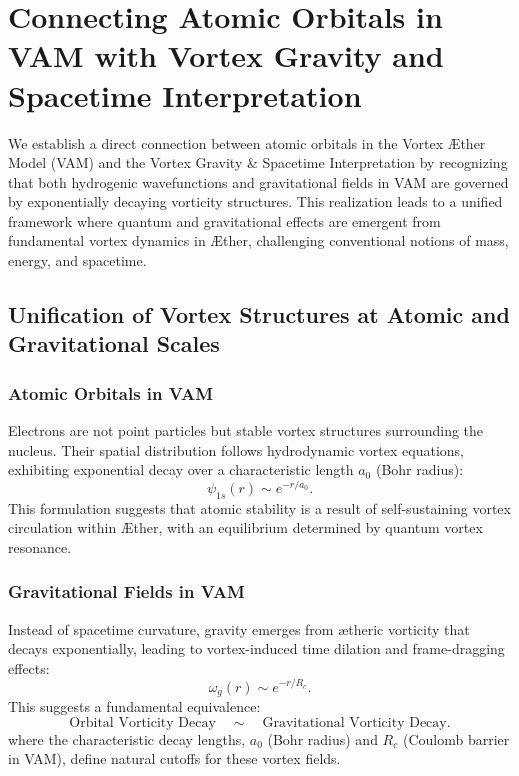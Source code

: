 
\section{Connecting Atomic Orbitals in VAM with Vortex Gravity and Spacetime Interpretation}


We establish a direct connection between atomic orbitals in the Vortex Æther Model (VAM) and the Vortex Gravity \& Spacetime Interpretation by recognizing that both hydrogenic wavefunctions and gravitational fields in VAM are governed by exponentially decaying vorticity structures. This realization leads to a unified framework where quantum and gravitational effects are emergent from fundamental vortex dynamics in Æther, challenging conventional notions of mass, energy, and spacetime.


\subsection*{Unification of Vortex Structures at Atomic and Gravitational Scales}


\subsubsection*{Atomic Orbitals in VAM}
Electrons are not point particles but stable vortex structures surrounding the nucleus. Their spatial distribution follows hydrodynamic vortex equations, exhibiting exponential decay over a characteristic length $a_0$ (Bohr radius):
\begin{equation*}
\psi_{1s}(r) \sim e^{-r/a_0}.
\end{equation*}
This formulation suggests that atomic stability is a result of self-sustaining vortex circulation within Æther, with an equilibrium determined by quantum vortex resonance.


\subsubsection*{Gravitational Fields in VAM}
Instead of spacetime curvature, gravity emerges from ætheric vorticity that decays exponentially, leading to vortex-induced time dilation and frame-dragging effects:
\begin{equation*}
\omega_{g}(r) \sim e^{-r/R_c}.
\end{equation*}
This suggests a fundamental equivalence:
\begin{equation*}
\text{Orbital Vorticity Decay} \quad \sim \quad \text{Gravitational Vorticity Decay}.
\end{equation*}
where the characteristic decay lengths, $a_0$ (Bohr radius) and $R_c$ (Coulomb barrier in VAM), define natural cutoffs for these vortex fields.


